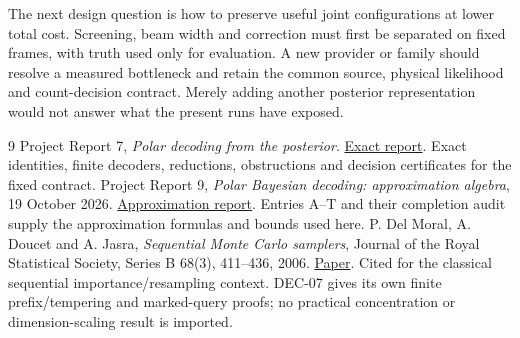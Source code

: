 \documentclass[10pt,a4paper]{article}
\begin{document}
The next design question is how to preserve useful joint configurations at lower total cost. Screening,
beam width and correction must first be separated on fixed frames, with truth used only for evaluation.
A new provider or family should resolve a measured bottleneck and retain the common source, physical
likelihood and count-decision contract. Merely adding another posterior representation would not answer
what the present runs have exposed.

\begin{thebibliography}{9}
 Project Report 7, \emph{Polar decoding from the posterior}.
\href{07_polar_decoding_from_posterior.pdf}{Exact report}. Exact identities, finite decoders, reductions,
obstructions and decision certificates for the fixed contract.
 Project Report 9, \emph{Polar Bayesian decoding: approximation algebra}, 19 October 2026.
\href{09_polar_bayesian_approximations.pdf}{Approximation report}. Entries A--T and their completion audit
supply the approximation formulas and bounds used here.
 P. Del Moral, A. Doucet and A. Jasra,
\emph{Sequential Monte Carlo samplers}, Journal of the Royal Statistical Society, Series B 68(3),
411--436, 2006.
\href{https://www.stats.ox.ac.uk/~doucet/delmoral_doucet_jasra_sequentialmontecarlosamplersJRSSB.pdf}{Paper}.
Cited for the classical sequential importance/resampling context. DEC-07 gives its own finite
prefix/tempering and marked-query proofs; no practical concentration or dimension-scaling result is imported.
\end{thebibliography}
\end{document}
